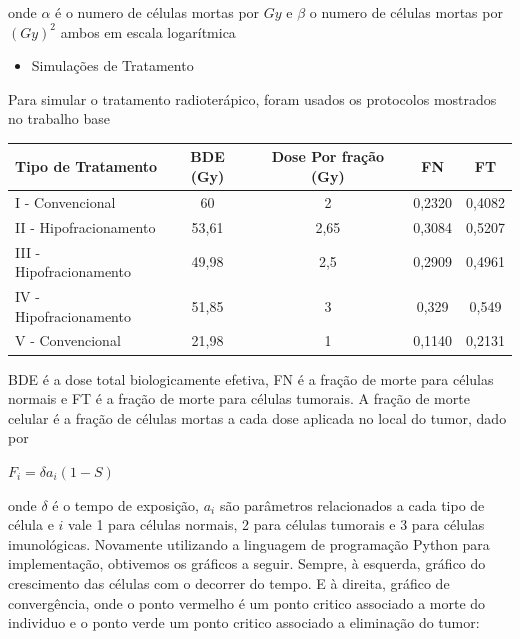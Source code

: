 \documentclass[12pt, a4paper]{article}
\begin{document}
onde $\alpha$ é o numero de células mortas por $Gy$ e  $\beta$ o numero de células mortas por $(Gy)^2$ ambos em escala logarítmica

\begin{itemize}
\item Simulações de Tratamento 
\end{itemize}

Para simular o tratamento radioterápico, foram usados os protocolos mostrados no trabalho base


\begin{center}
\begin{tabular}{l | c | c | c | c}
\hline
Tipo de Tratamento & BDE (Gy) & Dose Por fração (Gy) & FN & FT \\ \hline
I - Convencional & 60 & 2 & 0,2320 & 0,4082 \\ \hline
II - Hipofracionamento & 53,61 & 2,65 & 0,3084 & 0,5207 \\ \hline
III - Hipofracionamento &  49,98 & 2,5 & 0,2909 & 0,4961 \\ \hline
IV - Hipofracionamento & 51,85 & 3 & 0,329 & 0,549 \\ \hline
V - Convencional & 21,98 & 1 & 0,1140 & 0,2131 \\ 
\hline
\end{tabular}
\end{center}


BDE é a dose total biologicamente efetiva, FN é a fração de morte para células normais e FT é a fração de morte para células tumorais. A fração de morte celular é a fração de células mortas a cada dose aplicada no local do tumor, dado por

\begin{center}
$ F_i = \delta a_i (1 - S)$
\end{center}

onde $\delta$ é o tempo de exposição, $a_i$ são parâmetros relacionados a cada tipo de célula e $i$ vale 1 para células normais, 2 para células tumorais e 3 para células imunológicas. Novamente utilizando a linguagem de programação Python para implementação, obtivemos os gráficos a seguir. Sempre, à esquerda, gráfico do crescimento das células com o decorrer do tempo. E à direita, gráfico de convergência, onde o ponto vermelho é um ponto critico associado a morte do individuo e o ponto verde um ponto critico associado a eliminação do tumor:

\newpage
\end{document}
